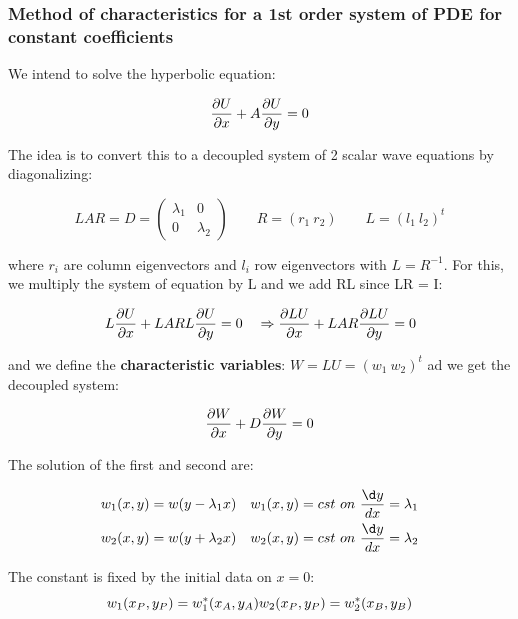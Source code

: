 \subsubsection{Method of characteristics for a 1st order system of PDE for constant coefficients}
	We intend to solve the hyperbolic equation: 
	
	\begin{equation}
	\frac{\D U}{\D x} + A \frac{\D U}{\D y} = 0
	\end{equation}
	
	The idea is to convert this to a decoupled system of 2 scalar wave equations by diagonalizing: 
	
	\begin{equation}
	LAR = D = \left( 
	\begin{array}{cc}
	\lambda _1 & 0\\
	0 & \lambda _2
	\end{array}
	\right) \qquad R = (r_1 \ r_2) \qquad L = (l_1 \ l_2) ^t
	\end{equation}
	
	where $r_i$ are column eigenvectors and $l_i$ row eigenvectors with $L = R^{-1}$. For this, we multiply the system of equation by L and we add RL since LR = I: 
	
	\begin{equation}
	L\frac{\D U}{\D x} + LARL \frac{\D U}{\D y} = 0 \quad \Rightarrow 	\frac{\D LU}{\D x} + LAR \frac{\D LU}{\D y} = 0
	\end{equation}
	
	and we define the \textbf{characteristic variables}: $W = LU = (w_1 \ w_2)^t$ ad we get the decoupled system: 
	
	\begin{equation}
	\frac{\D W}{\D x} + D \frac{\D W}{\D y} = 0
	\end{equation}
	
	The solution of the first and second are: 
	
	\begin{equation}
	\begin{aligned}
	w_1(x,y) = w(y- \lambda _1 x) \quad w_1(x,y) = cst \ on \ \frac{\d y}{dx} = \lambda _1\\
	w_2(x,y) = w(y+ \lambda _2 x) \quad w_2(x,y) = cst \ on \ \frac{\d y}{dx} = \lambda _2
	\end{aligned}
	\end{equation}
	
	The constant is fixed by the initial data on $x=0$: 
	\begin{equation}
	w_1(x_P, y_P) = w_1^* (x_A, y_A)\\
	w_2(x_P, y_P) = w_2^* (x_B, y_B)
	\end{equation}
	
